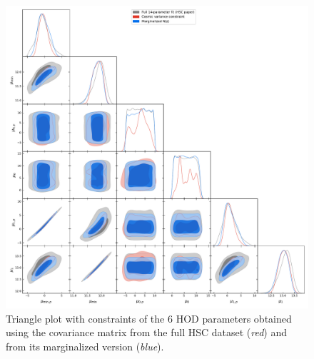 \documentclass[a4paper,11pt]{article}
\begin{document}
\begin{figure}[ht]
\centering  
\includegraphics[width=1.\textwidth]{./triangle_fid_marg}
\caption{Triangle plot with constraints of the 6 HOD parameters obtained using the covariance matrix from the full HSC dataset (\textit{red}) and from its marginalized version (\textit{blue}).}
\label{fig:triangle_fid_marg}
\end{figure}
\end{document}
